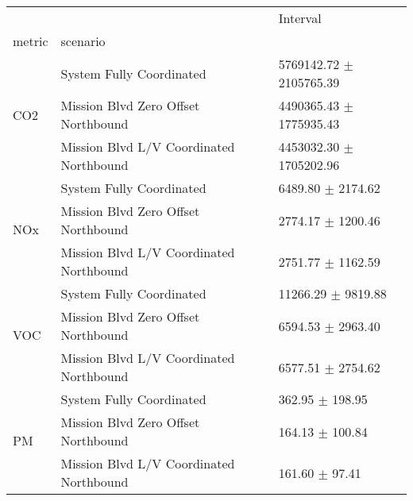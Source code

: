 \begin{tabular}{lll}
\toprule
 &  & Interval \\
metric & scenario &  \\
\midrule
\multirow[t]{3}{*}{CO2} & System Fully Coordinated & 5769142.72 $\pm$ 2105765.39 \\
 & Mission Blvd Zero Offset Northbound & 4490365.43 $\pm$ 1775935.43 \\
 & Mission Blvd L/V Coordinated Northbound & 4453032.30 $\pm$ 1705202.96 \\
\multirow[t]{3}{*}{NOx} & System Fully Coordinated & 6489.80 $\pm$ 2174.62 \\
 & Mission Blvd Zero Offset Northbound & 2774.17 $\pm$ 1200.46 \\
 & Mission Blvd L/V Coordinated Northbound & 2751.77 $\pm$ 1162.59 \\
\multirow[t]{3}{*}{VOC} & System Fully Coordinated & 11266.29 $\pm$ 9819.88 \\
 & Mission Blvd Zero Offset Northbound & 6594.53 $\pm$ 2963.40 \\
 & Mission Blvd L/V Coordinated Northbound & 6577.51 $\pm$ 2754.62 \\
\multirow[t]{3}{*}{PM} & System Fully Coordinated & 362.95 $\pm$ 198.95 \\
 & Mission Blvd Zero Offset Northbound & 164.13 $\pm$ 100.84 \\
 & Mission Blvd L/V Coordinated Northbound & 161.60 $\pm$ 97.41 \\
\bottomrule
\end{tabular}
